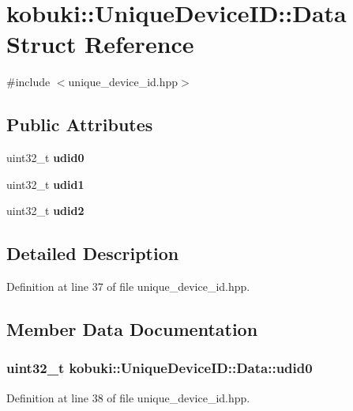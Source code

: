 \section{kobuki\-:\-:\-Unique\-Device\-I\-D\-:\-:\-Data \-Struct \-Reference}
\label{structkobuki_1_1UniqueDeviceID_1_1Data}


{\ttfamily \#include $<$unique\-\_\-device\-\_\-id.\-hpp$>$}

\subsection*{\-Public \-Attributes}
\begin{DoxyCompactItemize}
\item 
uint32\-\_\-t {\bf udid0}
\item 
uint32\-\_\-t {\bf udid1}
\item 
uint32\-\_\-t {\bf udid2}
\end{DoxyCompactItemize}


\subsection{\-Detailed \-Description}


\-Definition at line 37 of file unique\-\_\-device\-\_\-id.\-hpp.



\subsection{\-Member \-Data \-Documentation}
\subsubsection[{udid0}]{\setlength{\rightskip}{0pt plus 5cm}uint32\-\_\-t {\bf kobuki\-::\-Unique\-Device\-I\-D\-::\-Data\-::udid0}}\label{structkobuki_1_1UniqueDeviceID_1_1Data_a288e270b6772a5eba47f967c2216e995}


\-Definition at line 38 of file unique\-\_\-device\-\_\-id.\-hpp.


